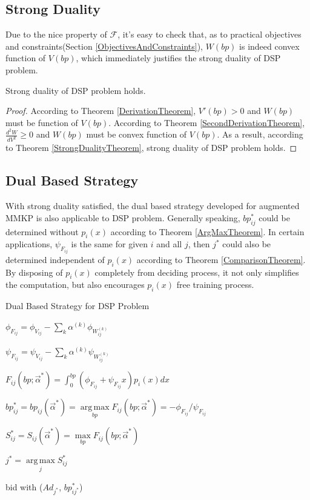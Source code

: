 \documentclass[sigconf]{acmart}
\DeclareMathOperator*{\argmax}{arg\,max}
\newcommand{\sbp}{bp_{ij}}
\newcommand{\sV}{V_{ij}}
\newcommand{\sW}{W_{ij}^{(k)}}
\newcommand{\salpha}{\alpha^{(k)}}
\newcommand{\sF}{F_{ij}}
\newcommand{\sS}{S_{ij}}
\newcommand{\valpha}{\vec{\alpha}}
\newcommand{\pprob}{\phi}
\newcommand{\pcost}{\psi}
\newcommand{\uff}{\mathscr{F}}
\begin{document}
\subsection{Strong Duality}

Due to the nice property of $\uff$, it's easy to check that,
    as to practical objectives and constraints(Section \ref{ObjectivesAndConstraints}),
    $W(bp)$ is indeed convex function of $V(bp)$,
    which immediately justifies the strong duality of DSP problem.

\begin{theorem} \label{DSPStrongDualityTheorem}
Strong duality of DSP problem holds.
\end{theorem}

\begin{proof}
According to Theorem \ref{DerivationTheorem}, $V'(bp)>0$ and $W(bp)$ must be function of $V(bp)$.
According to Theorem \ref{SecondDerivationTheorem}, $\frac{d^2W}{dV^2}\ge0$ and $W(bp)$ must be convex function of $V(bp)$.
As a result, according to Theorem \ref{StrongDualityTheorem}, strong duality of DSP problem holds.
\end{proof}

\subsection{Dual Based Strategy} \label{DSPDualBasedStrategy}

With strong duality satisfied, the dual based strategy developed for augmented MMKP is also applicable to DSP problem.
Generally speaking, $\sbp^*$ could be determined without $p_i(x)$ according to Theorem \ref{ArgMaxTheorem}.
In certain applications, $\pcost_{\sF}$ is the same for given $i$ and all $j$,
    then $j^*$ could also be determined independent of $p_i(x)$ according to Theorem \ref{ComparisonTheorem}.
By disposing of $p_i(x)$ completely from deciding process, it not only simplifies the computation,
    but also encourages $p_i(x)$ free training process.

\begin{algorithm}
\caption{Dual Based Strategy for DSP Problem}

{
  {
    $\pprob_{\sF} = \pprob_{\sV} - \sum\limits_k \salpha \pprob_{\sW}$

    $\pcost_{\sF} = \pcost_{\sV} - \sum\limits_k \salpha \pcost_{\sW}$

    $\sF(bp; \valpha^*) = \int_0^{bp} (\pprob_{\sF}+\pcost_{\sF}x)p_i(x)dx$

    $\sbp^* = \sbp(\valpha^*) = \argmax\limits_{bp} \sF(bp; \valpha^*) = -\pprob_{\sF} / \pcost_{\sF}$

    $\sS^* = \sS(\valpha^*) = \max\limits_{bp} \sF(bp; \valpha^*)$
  }
  $j^* = \argmax\limits_j \sS^*$
  
   { bid with ($Ad_{j^*}$, $bp_{ij^*}^*$) }
}
\end{algorithm}
\end{document}

